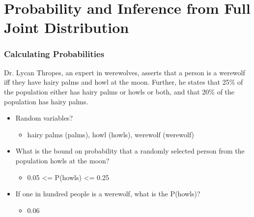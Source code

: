 \documentclass[compress, 9pt]{beamer}
\begin{document}
\section{Probability and Inference from Full Joint Distribution}
\label{sec-2}
\begin{frame}
\frametitle{Calculating Probabilities}
\label{sec-2-1}

Dr. Lycan Thropes, an expert in werewolves, asserts that a person is a werewolf 
iff they have hairy palms and howl at the moon. Further, he states that 25\% of the 
population either has hairy palms or howls or both, and that 20\% of the
population has hairy palms.
\begin{itemize}

\item <1-> Random variables?
\label{sec-2-1-1}%
\begin{itemize}

\item <2-> hairy palms (palms), howl (howls), werewolf (werewolf)
\label{sec-2-1-1-1}%
\end{itemize} %

\item <3-> What is the bound on probability that a randomly selected person from the population howls at the moon?
\label{sec-2-1-2}%
\begin{itemize}

\item <4-> 0.05 <= P(howls) <= 0.25
\label{sec-2-1-2-1}%
\end{itemize} %

\item <5-> If one in hundred people is a werewolf, what is the P(howls)?
\label{sec-2-1-3}%
\begin{itemize}

\item <6-> 0.06
\label{sec-2-1-3-1}%

\end{itemize} %
\end{itemize} %
\end{frame}
\end{document}
